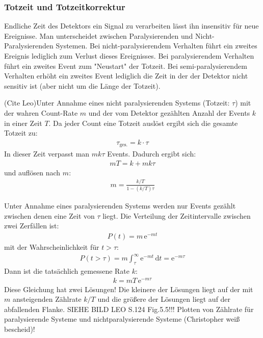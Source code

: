 \documentclass[11pt, a4paper]{article}
\numberwithin{equation}{section}
\begin{document}
\subsubsection{Totzeit und Totzeitkorrektur}
Endliche Zeit des Detektors ein Signal zu verarbeiten lässt ihn insensitiv für neue Ereignisse.
Man unterscheidet zwischen Paralysierenden und Nicht-Paralysierenden Systemen.
Bei nicht-paralysierendem Verhalten führt ein zweites Ereignis lediglich zum Verlust dieses Ereignisses.
Bei paralysierendem Verhalten führt ein zweites Event zum "Neustart" der Totzeit.
Bei semi-paralysierendem Verhalten erhöht ein zweites Event lediglich die Zeit in der der Detektor nicht sensitiv ist (aber nicht um die Länge der Totzeit).

(Cite Leo)Unter Annahme eines nicht paralysierenden Systems (Totzeit: $\tau$) mit der wahren Count-Rate $m$ und der vom Detektor gezählten Anzahl der Events $k$ in einer Zeit $T$.
Da jeder Count eine Totzeit auslöst ergibt sich die gesamte Totzeit zu:
\begin{align}
	\tau_\mathrm{ges.} = k \cdot \tau
\end{align}
In dieser Zeit verpasst man $m k \tau$ Events.
Dadurch ergibt sich:
\begin{align}
	m T = k + m k \tau
\end{align}
und auflösen nach $m$:
\begin{align}
	m = \frac{k / T}{1 - (k/T) \tau}
\end{align}

Unter Annahme eines paralysierenden Systems werden nur Events gezählt zwischen denen eine Zeit von $\tau$ liegt.
Die Verteilung der Zeitintervalle zwischen zwei Zerfällen ist:
\begin{align}
	P(t) = m \, \mathrm{e}^{-m t}
\end{align}
mit der Wahrscheinlichkeit für $t > \tau$:
\begin{align}
	P(t>\tau) = m \int_{\tau}^{\infty} \mathrm{e}^{-m t} \, \mathrm{d}t = \mathrm{e}^{-m \tau}
\end{align}
Dann ist die tatsächlich gemessene Rate $k$:
\begin{align}
	k = m T \, \mathrm{e}^{-m \tau} \label{eq:totzeit_paralysierend}
\end{align}
Diese Gleichung hat zwei Lösungen!
Die kleinere der Lösungen liegt auf der mit $m$ ansteigenden Zählrate $k/T$ und die größere der Lösungen liegt auf der abfallenden Flanke.
SIEHE BILD LEO S.124 Fig.5.5!!!
Plotten von Zählrate für paralysierende Systeme und nichtparalysierende Systeme (Christopher weiß bescheid)!
\end{document}
